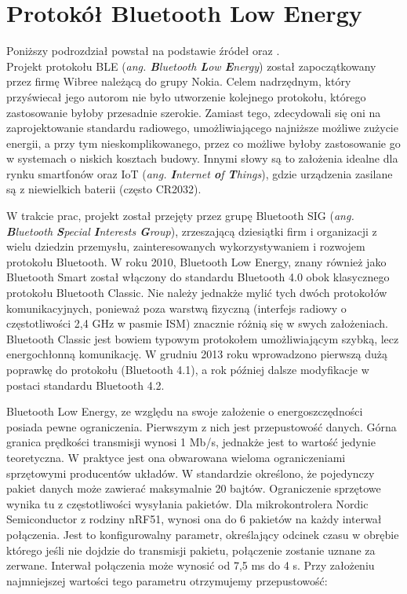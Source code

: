 \section{Protokół Bluetooth Low Energy}
\label{bluetooth}

Poniższy podrozdział powstał na podstawie źródeł \cite{BLE} oraz \cite{inzynierka}.\\

Projekt protokołu BLE (\textit{ang. \textbf{B}luetooth \textbf{L}ow \textbf{E}nergy}) został zapoczątkowany przez firmę Wibree należącą do grupy Nokia. Celem nadrzędnym, który przyświecał jego autorom nie było utworzenie kolejnego protokołu, którego zastosowanie byłoby przesadnie szerokie. Zamiast tego, zdecydowali się oni na zaprojektowanie standardu radiowego, umożliwiającego najniższe możliwe zużycie energii, a przy tym nieskomplikowanego, przez co możliwe byłoby zastosowanie go w systemach o niskich kosztach budowy. Innymi słowy są to założenia idealne dla rynku smartfonów oraz IoT (\textit{ang. \textbf{I}nternet \textbf{o}f \textbf{T}hings}), gdzie urządzenia zasilane są z niewielkich baterii (często CR2032).

W trakcie prac, projekt został przejęty przez grupę Bluetooth SIG (\textit{ang. \textbf{B}luetooth \textbf{S}pecial \textbf{I}nterests \textbf{G}roup}), zrzeszającą dziesiątki firm i organizacji z wielu dziedzin przemysłu, zainteresowanych wykorzystywaniem i rozwojem protokołu Bluetooth. W roku 2010, Bluetooth Low Energy, znany również jako Bluetooth Smart został włączony do standardu Bluetooth 4.0 obok klasycznego protokołu Bluetooth Classic. Nie należy jednakże mylić tych dwóch protokołów komunikacyjnych, ponieważ poza warstwą fizyczną (interfejs radiowy o częstotliwości 2,4 GHz w pasmie ISM) znacznie różnią się w swych założeniach. Bluetooth Classic jest bowiem typowym protokołem umożliwiającym szybką, lecz energochłonną komunikację. W grudniu 2013 roku wprowadzono pierwszą dużą poprawkę do protokołu (Bluetooth 4.1), a rok później dalsze modyfikacje w postaci standardu Bluetooth 4.2. 

Bluetooth Low Energy, ze względu na swoje założenie o energoszczędności posiada pewne ograniczenia. Pierwszym z nich jest przepustowość danych. Górna granica prędkości transmisji wynosi 1 Mb/s, jednakże jest to wartość jedynie teoretyczna. W praktyce jest ona obwarowana wieloma ograniczeniami sprzętowymi producentów układów. W standardzie określono, że pojedynczy pakiet danych może zawierać maksymalnie 20 bajtów. Ograniczenie sprzętowe wynika tu z częstotliwości wysyłania pakietów. Dla  mikrokontrolera Nordic Semiconductor z rodziny nRF51, wynosi ona do 6 pakietów na każdy interwał połączenia. Jest to konfigurowalny parametr, określający odcinek czasu w obrębie którego jeśli nie dojdzie do transmisji pakietu, połączenie zostanie uznane za zerwane. Interwał połączenia może wynosić od 7,5 ms do 4 s. Przy założeniu najmniejszej wartości tego parametru otrzymujemy przepustowość:

